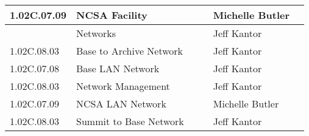 \begin{longtable}{|p{}|p{}|p{}|p{}|p{}|p{}|}
1.02C.07.09 &  NCSA Facility &  &  & Michelle Butler & \\ \hline
 &  Networks &  &  & Jeff Kantor & \\ \hline
1.02C.08.03 &  Base to Archive Network &  &  & Jeff Kantor & \\ \hline
1.02C.07.08 &  Base LAN Network &  &  & Jeff Kantor & \\ \hline
1.02C.08.03 &  Network Management &  &  & Jeff Kantor & \\ \hline
1.02C.07.09 &  NCSA LAN Network &  &  & Michelle Butler & \\ \hline
1.02C.08.03 &  Summit to Base Network &  &  & Jeff Kantor & \\ \hline
\end{longtable}
\normalsize
